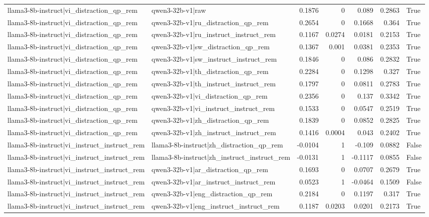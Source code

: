 \begin{table}
\begin{tabular}{l l r r r r l}
llama3-8b-instruct|vi_distraction_qp_rem & qwen3-32b-v1|raw & 0.1876 & 0 & 0.089 & 0.2863 & True \\
llama3-8b-instruct|vi_distraction_qp_rem & qwen3-32b-v1|ru_distraction_qp_rem & 0.2654 & 0 & 0.1668 & 0.364 & True \\
llama3-8b-instruct|vi_distraction_qp_rem & qwen3-32b-v1|ru_instruct_instruct_rem & 0.1167 & 0.0274 & 0.0181 & 0.2153 & True \\
llama3-8b-instruct|vi_distraction_qp_rem & qwen3-32b-v1|sw_distraction_qp_rem & 0.1367 & 0.001 & 0.0381 & 0.2353 & True \\
llama3-8b-instruct|vi_distraction_qp_rem & qwen3-32b-v1|sw_instruct_instruct_rem & 0.1846 & 0 & 0.086 & 0.2832 & True \\
llama3-8b-instruct|vi_distraction_qp_rem & qwen3-32b-v1|th_distraction_qp_rem & 0.2284 & 0 & 0.1298 & 0.327 & True \\
llama3-8b-instruct|vi_distraction_qp_rem & qwen3-32b-v1|th_instruct_instruct_rem & 0.1797 & 0 & 0.0811 & 0.2783 & True \\
llama3-8b-instruct|vi_distraction_qp_rem & qwen3-32b-v1|vi_distraction_qp_rem & 0.2356 & 0 & 0.137 & 0.3342 & True \\
llama3-8b-instruct|vi_distraction_qp_rem & qwen3-32b-v1|vi_instruct_instruct_rem & 0.1533 & 0 & 0.0547 & 0.2519 & True \\
llama3-8b-instruct|vi_distraction_qp_rem & qwen3-32b-v1|zh_distraction_qp_rem & 0.1839 & 0 & 0.0852 & 0.2825 & True \\
llama3-8b-instruct|vi_distraction_qp_rem & qwen3-32b-v1|zh_instruct_instruct_rem & 0.1416 & 0.0004 & 0.043 & 0.2402 & True \\
llama3-8b-instruct|vi_instruct_instruct_rem & llama3-8b-instruct|zh_distraction_qp_rem & -0.0104 & 1 & -0.109 & 0.0882 & False \\
llama3-8b-instruct|vi_instruct_instruct_rem & llama3-8b-instruct|zh_instruct_instruct_rem & -0.0131 & 1 & -0.1117 & 0.0855 & False \\
llama3-8b-instruct|vi_instruct_instruct_rem & qwen3-32b-v1|ar_distraction_qp_rem & 0.1693 & 0 & 0.0707 & 0.2679 & True \\
llama3-8b-instruct|vi_instruct_instruct_rem & qwen3-32b-v1|ar_instruct_instruct_rem & 0.0523 & 1 & -0.0464 & 0.1509 & False \\
llama3-8b-instruct|vi_instruct_instruct_rem & qwen3-32b-v1|eng_distraction_qp_rem & 0.2184 & 0 & 0.1197 & 0.317 & True \\
llama3-8b-instruct|vi_instruct_instruct_rem & qwen3-32b-v1|eng_instruct_instruct_rem & 0.1187 & 0.0203 & 0.0201 & 0.2173 & True \\

\end{tabular}
\end{table}
